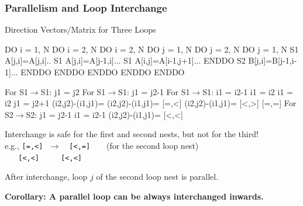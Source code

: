 \documentclass{beamer}
\renewcommand{\emph}[1]{\textcolor{structure}{#1}}
\newcommand{\emp}[1]{\textcolor{DikuRed}{ #1}}
\newcommand{\mymath}[1]{$ #1 $}
\begin{document}
\begin{frame}[fragile,t]
  \frametitle{Parallelism and Loop Interchange} 

\begin{block}{Direction Vectors/Matrix for Three Loops }
\begin{colorcode}
  DO i = 1, N            DO i = 2, N               DO i = 2, N
    DO j = 1, N            DO j = 2, N               DO j = 1, N 
S1    A[j,i]=A[j,i]..  S1   A[j,i]=A[j-1,i]...   S1    A[i,j]=A[i-1,j+1]...
    ENDDO              S2   B[j,i]=B[j-1,i-1]...     ENDDO
  ENDDO                  ENDDO ENDDO               ENDDO

For S1\mymath{\rightarrow}S1: j1 = j2    For S1\mymath{\rightarrow}S1: j1 = j2-1          For S1\mymath{\rightarrow}S1: i1 = i2-1
            i1 = i2                i1 = i2                    j1 = j2+1
(i2,j2)-(i1,j1)=         (i2,j2)-(i1,j1)=\emp{[=,<]}        (i2,j2)-(i1,j1)=\emp{[<,>]}
\emp{[=,=]}                  For S2\mymath{\rightarrow}S2: j1 = j2-1
                                   i1 = i2-1
                         (i2,j2)-(i1,j1)=\emp{[<,<]}
\end{colorcode}
\end{block} 

Interchange is safe for the first and second nests, but not for the third!\\
e.g., \emp{\tt [=,<]}$~~~\rightarrow~~~$ \emph{\tt [<,=]}$~~~~~~~~~$(for the second loop nest)\\
$~~~~~~$\emp{\tt [<,<]}$~~~~~~~~~~~~$\emph{\tt [<,<]}

\pause\smallskip

After interchange, loop $j$ of the second loop nest is parallel.

\bigskip

\emph{\bf Corollary: A parallel loop can be always interchanged inwards.}
\end{frame}
\end{document}
